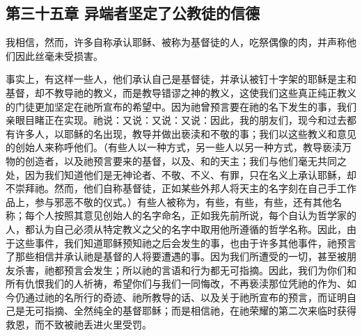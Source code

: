 
\subsection{第三十五章 异端者坚定了公教徒的信德}

我相信，然而，许多自称承认耶稣、被称为基督徒的人，吃祭偶像的肉，并声称他们因此丝毫未受损害。\par

事实上，有这样一些人，他们承认自己是基督徒，并承认被钉十字架的耶稣是主和基督，却不教导祂的教义，而是教导错谬之神的教义，这使我们这些真正纯正教义的门徒更加坚定在祂所宣布的希望中。因为祂曾预言要在祂的名下发生的事，我们亲眼目睹正在实现。祂说：又说：又说：又说：因此，我的朋友们，现今和过去都有许多人，以耶稣的名出现，教导并做出亵渎和不敬的事；我们以这些教义和意见的创始人来称呼他们。（有些人以一种方式，另一些人以另一种方式，教导亵渎万物的创造者，以及祂预言要来的基督，以及、和的天主；我们与他们毫无共同之处，因为我们知道他们是无神论者、不敬、不义、有罪，只在名义上承认耶稣，却不崇拜祂。然而，他们自称基督徒，正如某些外邦人将天主的名字刻在自己手工作品上，参与邪恶不敬的仪式。）有些人被称为，有些，有些，有些，还有其他名称；每个人按照其意见创始人的名字命名，正如我先前所说，每个自认为哲学家的人，都认为自己必须从特定教义之父的名字中取用他所遵循的哲学名称。因此，由于这些事件，我们知道耶稣预知祂之后会发生的事，也由于许多其他事件，祂预言了那些相信并承认祂是基督的人将要遭遇的事。因为我们所遭受的一切，甚至被朋友杀害，祂都预言会发生；所以祂的言语和行为都无可指摘。因此，我们为你们和所有仇恨我们的人祈祷，希望你们与我们一同悔改，不再亵渎那位凭祂的作为、如今仍通过祂的名所行的奇迹、祂所教导的话、以及关于祂所宣布的预言，而证明自己是无可指摘、全然纯全的基督耶稣；而是相信祂，在祂荣耀的第二次来临时获得救恩，而不致被祂丢进火里受罚。\par


